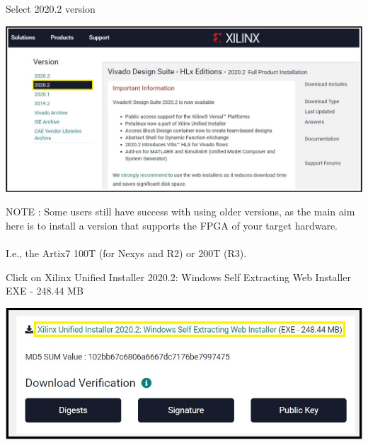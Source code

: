 \begin{minipage}{\linewidth}
  Select 2020.2 version
  \\
  \begin{center}
    \includegraphics[width=\linewidth]{images/VivadoInstimg002.jpg}
  \end{center}
  NOTE : Some users still have success with using older versions, as the main aim here is to install a version that supports the FPGA of your target hardware. \\
  \\
  I.e., the Artix7 100T (for Nexys and R2) or 200T (R3).
\end{minipage}

\begin{minipage}{\linewidth}
  Click on Xilinx Unified Installer 2020.2: Windows Self Extracting Web Installer EXE - 248.44 MB 
  \\
  \begin{center}
    \includegraphics[width=0.8\linewidth]{images/VivadoInstimg003.jpg}
  \end{center}
\end{minipage}

